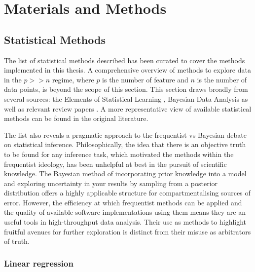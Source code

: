 \documentclass[../main.tex]{subfiles}
\begin{document}
\chapter{Materials and Methods}

\section{Statistical Methods}

The list of statistical methods described has been curated to cover the methods implemented in this thesis.
A comprehensive overview of methods to explore data in the $p >> n$ regime, where $p$ is the number of feature and $n$ is the number of data points, is beyond the scope of this section.
This section draws broadly from several sources: the Elements of Statistical Learning \parencite{Hastie2009}, Bayesian Data Analysis \parencite{Gelman2014} as well as relevant review papers \parencite{Greener2021, Wu2015}.
A more representative view of available statistical methods can be found in the original literature.

The list also reveals a pragmatic approach to the frequentist vs Bayesian debate on statistical inference.
Philosophically, the idea that there is an objective truth to be found for any inference task, which motivated the methods within the frequentist ideology, has been unhelpful at best in the pursuit of scientific knowledge.
The Bayesian method of incorporating prior knowledge into a model and exploring uncertainty in your results by sampling from a posterior distribution offers a highly applicable structure for compartmentalising sources of error.
However, the efficiency at which frequentist methods can be applied and the quality of available software implementations using them means they are an useful tools in high-throughput data analysis.
Their use as methods to highlight fruitful avenues for further exploration is distinct from their misuse as arbitrators of truth. 

\subsection{Linear regression}
\end{document}
